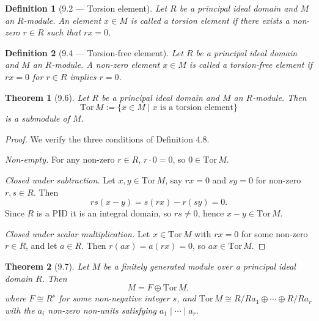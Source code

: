 \documentclass[12pt]{article}
\newtheorem{theorem}{Theorem}
\newtheorem{definition}{Definition}
\begin{document}
\begin{definition}[9.2 — Torsion element]
Let $R$ be a principal ideal domain and $M$ an $R$-module. An element $x \in M$ is called a \emph{torsion element} if there exists a non-zero $r \in R$ such that $rx = 0$.
\end{definition}

\begin{definition}[9.4 — Torsion-free element]
Let $R$ be a principal ideal domain and $M$ an $R$-module. A non-zero element $x \in M$ is called a \emph{torsion-free element} if $rx = 0$ for $r \in R$ implies $r = 0$.
\end{definition}

\begin{theorem}[9.6]
Let $R$ be a principal ideal domain and $M$ an $R$-module. Then
\[
  \mathrm{Tor}\, M := \{x \in M \mid x \text{ is a torsion element}\}
\]
is a submodule of $M$.
\end{theorem}

\begin{proof}
We verify the three conditions of Definition 4.8.

\textit{Non-empty.} For any non-zero $r \in R$, $r \cdot 0 = 0$, so $0 \in \mathrm{Tor}\, M$.

\textit{Closed under subtraction.} Let $x, y \in \mathrm{Tor}\, M$, say $rx = 0$ and $sy = 0$ for non-zero $r, s \in R$. Then
\[
  rs(x - y) = s(rx) - r(sy) = 0.
\]
Since $R$ is a PID it is an integral domain, so $rs \neq 0$, hence $x - y \in \mathrm{Tor}\, M$.

\textit{Closed under scalar multiplication.} Let $x \in \mathrm{Tor}\, M$ with $rx = 0$ for some non-zero $r \in R$, and let $a \in R$. Then $r(ax) = a(rx) = 0$, so $ax \in \mathrm{Tor}\, M$.
\end{proof}

\begin{theorem}[9.7]
Let $M$ be a finitely generated module over a principal ideal domain $R$. Then
\[
  M = F \oplus \mathrm{Tor}\, M,
\]
where $F \cong R^s$ for some non-negative integer $s$, and $\mathrm{Tor}\, M \cong R/Ra_1 \oplus \cdots \oplus R/Ra_r$ with the $a_i$ non-zero non-units satisfying $a_1 \mid \cdots \mid a_r$.
\end{theorem}
\end{document}
